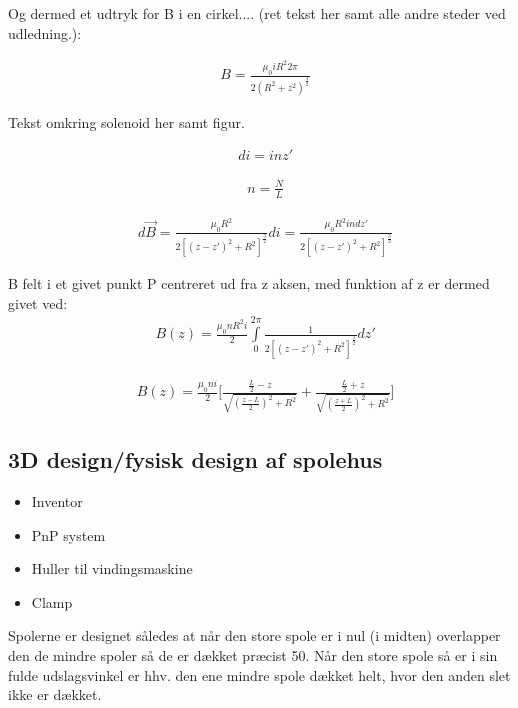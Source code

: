 Og dermed et udtryk for B i en cirkel.... (ret tekst her samt alle andre steder ved udledning.):


\begin{align}
	&B=\frac{\mu_0 iR^2 2\pi}{2(R^2+z^2)^\frac{3}{2}}
\end{align}




Tekst omkring solenoid her samt figur.



\begin{align}
	&di=inz'
\end{align}

\begin{align}
	&n=\frac{N}{L}
\end{align}

\begin{align}
	&d\vec{B}=\frac{\mu_0 R^2}{2[(z-z')^2+R^2]^\frac{3}{2}}di = \frac{\mu_0 R^2 i n dz'}{2[(z-z')^2+R^2]^\frac{3}{2}}
\end{align}


B felt i et givet punkt P centreret ud fra z aksen, med funktion af z er dermed givet ved:
\begin{align}
	&B(z)=\frac{\mu_0 n R^2 i}{2}\int\limits_{0}^{2\pi}\frac{1}{2[(z-z')^2+R^2]^\frac{3}{2}}dz'
\end{align}

\begin{align}
	&B(z)=\frac{\mu_0 n i}{2}\bigg[\frac{\frac{L}{2}-z}{\sqrt{(\frac{z-L}{2})^2+R^2}}+\frac{\frac{L}{2}+z}{\sqrt{(\frac{z+L}{2})^2+R^2}}\bigg]
\end{align}

\subsection{3D design/fysisk design af spolehus}
\begin{itemize}
	\item Inventor
	\item PnP system
	\item Huller til vindingsmaskine
	\item Clamp
\end{itemize}
Spolerne er designet således at når den store spole er i nul (i midten) overlapper den de mindre spoler så de er dækket præcist 50\percent. Når den store spole så er i sin fulde udslagsvinkel er hhv. den ene mindre spole dækket helt, hvor den anden slet ikke er dækket. \\

